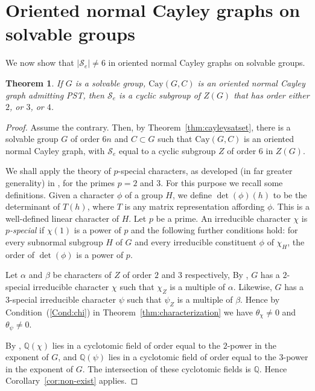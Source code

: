 \documentclass{amsart}
\theoremstyle{plain}
\newtheorem{theorem}{Theorem}[section]
\theoremstyle{remark}\newtheorem{con}[theorem]{Construction}
\theoremstyle{remark} \newtheorem*{remark}{Remark}
\theoremstyle{remark} \newtheorem{example}{Example}
\newcommand{\mrm}{\mathrm}
\newcommand{\cS}{\mathcal{S}}
\begin{document}
\section{Oriented normal Cayley graphs on solvable groups}\label{sec:solvable}
We now show that $\vert \cS_e \vert \neq 6$ in oriented normal Cayley graphs on solvable groups.
\begin{theorem}\label{thm:solvableMST}
    If $G$ is a solvable group, $\mrm{Cay}(G, C)$ is an oriented normal Cayley graph admitting PST, then $\cS_e$ is a cyclic subgroup of $Z(G)$ that has order either $2$, or $3$, or $4$.
\end{theorem}
\begin{proof}
  Assume the contrary. Then, by Theorem~\ref{thm:cayleysatset}, there is a
  solvable group $G$ of order $6n$ and $C \subset G$ such that $\mrm{Cay}(G, C)$ is an oriented normal Cayley graph, with $\cS_{e}$ equal to a cyclic subgroup $Z$  of order $6$ in $Z(G)$.

  We shall apply the theory of $p$-special characters, as developed (in far greater generality) in \cite{Gajendragadkar}, for the primes $p=2$ and $3$. For this purpose we recall some definitions. Given a character $\phi$ of a group $H$, we define
  $\det(\phi)(h)$ to be the determinant of $T(h)$, where $T$ is
  any matrix representation affording $\phi$. This is a well-defined linear character of $H$.  Let $p$ be a prime. An irreducible
  character $\chi$ is {\it $p$-special} if $\chi(1)$ is a power of $p$
  and the following further conditions hold: for every subnormal subgroup
  $H$ of $G$ and every irreducible constituent $\phi$ of $\chi_H$,
  the order of $\det(\phi)$ is a power of $p$.

  Let $\alpha$ and $\beta$ be characters of $Z$ of order $2$ and $3$
  respectively, By \cite[Cor. 4.8]{Gajendragadkar}, $G$ has a $2$-special
  irreducible character $\chi$ such that $\chi_Z$ is a multiple of $\alpha$.
  Likewise, $G$ has a $3$-special irreducible character $\psi$ such that
  $\psi_Z$ is a multiple of $\beta$. Hence
  by Condition~(\ref{Cond:chi}) in Theorem~\ref{thm:characterization} we have $\theta_\chi\neq 0$ and $\theta_\psi\neq 0$.
  
  By \cite[Prop. 6.3(a)]{Gajendragadkar},  $\mathbb Q(\chi)$ lies in
  a cyclotomic field of order equal to the  $2$-power in the exponent of $G$,
  and $\mathbb Q(\psi)$ lies in
  a cyclotomic field of order equal to the  $3$-power in the exponent of $G$. The intersection of these
  cyclotomic fields is $\mathbb Q$. Hence Corollary~\ref{cor:non-exist} applies.
\end{proof}
\end{document}
